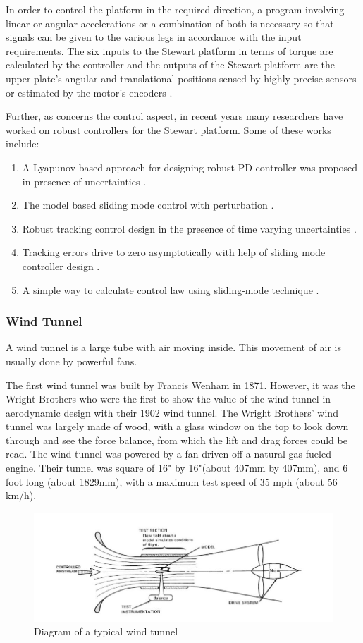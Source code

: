 In order to control the platform in the required direction, a program involving linear or angular accelerations or a combination of both is necessary so that signals can be given to the various legs in accordance with the input requirements. The six inputs to the Stewart platform in terms of torque are calculated by the controller and the outputs of the Stewart platform are the upper plate's angular and translational positions sensed by highly precise sensors or estimated by the motor's encoders \cite{iqbal_dynamic_2008}.

Further, as concerns the control aspect, in recent years many researchers have worked on robust controllers for the Stewart platform. Some of these works include:
\begin{enumerate}
\item A Lyapunov based approach for designing robust PD controller was proposed in presence of uncertainties 
\cite{kang1996robust}.
\item The model based sliding mode control with perturbation 
\cite{kang1996robust}.
\item Robust tracking control design in the presence of time varying
uncertainties 
\cite{kim1998high}.
\item Tracking errors drive to zero asymptotically with help of sliding mode
controller design 
\cite{huang2004sliding}.
\item A simple way to calculate control law using sliding-mode technique 
\cite{iqbal2006direct}.
\end{enumerate}

\subsubsection{Wind Tunnel}
A wind tunnel is a large tube with air moving inside. This movement of air is usually done by powerful fans. 

The first wind tunnel was built by Francis Wenham in 1871. However, it was the Wright Brothers who were the first to show the value of the wind tunnel in aerodynamic design with their 1902 wind tunnel.  The Wright Brothers’ wind tunnel was largely made of wood, with a glass window on the top to look down through and see the force balance, from which the
lift and drag forces could be read. The wind tunnel was powered by a fan driven off a natural gas fueled engine. Their tunnel was square of 16" by 16"(about 407mm by 407mm), and 6 foot long (about 1829mm), with a maximum test speed of 35 mph (about 56 km/h).
\begin{center}
	\begin{figure}[!h]
	\centering
	\includegraphics[width=0.75\linewidth]{Figures/Fig2}
	\caption{Diagram of a typical wind tunnel}
	\end{figure}
\end{center}

